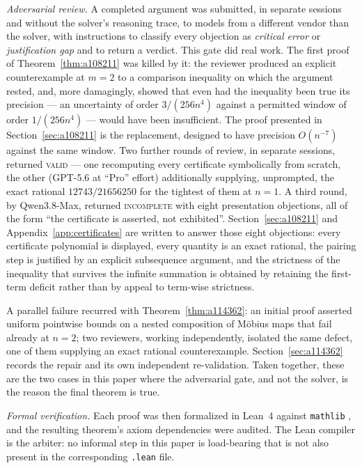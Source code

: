 \documentclass[11pt]{article}
\theoremstyle{plain}
\theoremstyle{definition}
\theoremstyle{remark}
\numberwithin{equation}{section}
\begin{document}
\emph{Adversarial review.} A completed argument was submitted, in separate sessions and without
the solver's reasoning trace, to models from a different vendor than the solver, with
instructions to classify every objection as \emph{critical error} or \emph{justification gap}
and to return a verdict. This gate did real work. The first proof of Theorem~\ref{thm:a108211}
was killed by it: the reviewer produced an explicit counterexample at $m=2$ to a comparison
inequality on which the argument rested, and, more damagingly, showed that even had the
inequality been true its precision --- an uncertainty of order $3/(256n^4)$ against a permitted
window of order $1/(256n^4)$ --- would have been insufficient. The proof presented in
Section~\ref{sec:a108211} is the replacement, designed to have precision $O(n^{-7})$ against the
same window. Two further rounds of review, in separate sessions, returned \textsc{valid} --- one
recomputing every certificate symbolically from scratch, the other (GPT-5.6 at ``Pro'' effort)
additionally supplying, unprompted, the exact rational $12743/21656250$ for the tightest of them
at $n=1$. A third round, by Qwen3.8-Max, returned \textsc{incomplete} with eight presentation
objections, all of the form
``the certificate is asserted, not exhibited''. Section~\ref{sec:a108211} and
Appendix~\ref{app:certificates} are written to answer those eight objections: every certificate
polynomial is displayed, every quantity is an exact rational, the pairing step is justified by
an explicit subsequence argument, and the strictness of the inequality that survives the
infinite summation is obtained by retaining the first-term deficit rather than by appeal to
term-wise strictness.

A parallel failure recurred with Theorem~\ref{thm:a114362}: an initial proof asserted uniform
pointwise bounds on a nested composition of M\"obius maps that fail already at $n=2$; two
reviewers, working independently, isolated the same defect, one of them supplying an exact
rational counterexample. Section~\ref{sec:a114362} records the repair and its own independent
re-validation. Taken together, these are the two cases in this paper where the adversarial gate,
and not the solver, is the reason the final theorem is true.

\emph{Formal verification.} Each proof was then formalized in Lean~4 against
\texttt{mathlib} \cite{lean4,mathlib}, and the resulting theorem's axiom dependencies were
audited. The Lean compiler is the arbiter: no informal step in this paper is load-bearing that
is not also present in the corresponding \texttt{.lean} file.
\end{document}
